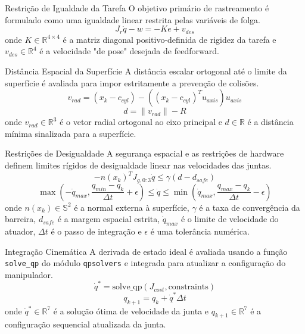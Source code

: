 \documentclass[aspectratio=169]{beamer}
\begin{document}
\begin{frame}{Restrição de Igualdade da Tarefa}
O objetivo primário de rastreamento é formulado como uma igualdade linear restrita pelas variáveis de folga.
\begin{equation}
    J_r \dot{q} - w = -K e + v_{des}
\end{equation}
onde $K \in \mathbb{R}^{4 \times 4}$ é a matriz diagonal positivo-definida de rigidez da tarefa e $v_{des} \in \mathbb{R}^4$ é a velocidade "de pose" desejada de feedforward.
\end{frame}

\begin{frame}{Distância Espacial da Superfície}
A distância escalar ortogonal até o limite da superfície é avaliada para impor estritamente a prevenção de colisões.
\begin{equation}
    v_{rad} = (x_k - c_{cyl}) - \left( (x_k - c_{cyl})^T u_{axis} \right) u_{axis}
\end{equation}
\begin{equation}
    d = \|v_{rad}\| - R
\end{equation}
onde $v_{rad} \in \mathbb{R}^3$ é o vetor radial ortogonal ao eixo principal e $d \in \mathbb{R}$ é a distância mínima sinalizada para a superfície.
\end{frame}

\begin{frame}{Restrições de Desigualdade}
A segurança espacial e as restrições de hardware definem limites rígidos de desigualdade linear nas velocidades das juntas.
\begin{equation}
    -n(x_k)^T J_{g, 0:3} \dot{q} \leq \gamma (d - d_{safe})
\end{equation}
\begin{equation}
    \max \left(-\dot{q}_{max}, \frac{q_{min}-q_k}{\Delta t} + \epsilon \right) \leq \dot{q} \leq \min \left(\dot{q}_{max}, \frac{q_{max}-q_k}{\Delta t} - \epsilon \right)
\end{equation}
onde $n(x_k) \in \mathbb{S}^2$ é a normal externa à superfície, $\gamma$ é a taxa de convergência da barreira, $d_{safe}$ é a margem espacial estrita, $\dot{q}_{max}$ é o limite de velocidade do atuador, $\Delta t$ é o passo de integração e $\epsilon$ é uma tolerância numérica.
\end{frame}

\begin{frame}{Integração Cinemática}
A derivada de estado ideal é avaliada usando a função \texttt{solve\_qp} do módulo \texttt{qpsolvers} e integrada para atualizar a configuração do manipulador.
\begin{equation}
    \dot{q}^* = \text{solve\_qp}(J_{cost}, \text{constraints})
\end{equation}
\begin{equation}
    q_{k+1} = q_k + \dot{q}^* \Delta t
\end{equation}
onde $\dot{q}^* \in \mathbb{R}^7$ é a solução ótima de velocidade da junta e $q_{k+1} \in \mathbb{R}^7$ é a configuração sequencial atualizada da junta.
\end{frame}
\end{document}
